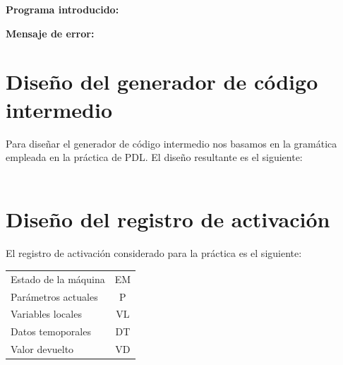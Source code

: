 \documentclass[11pt, , a4paper, titlepage]{article}
\newenvironment{changemargin}[2]{%
\begin{list}{}{%
\setlength{\topsep}{0pt}%
\setlength{\leftmargin}{#1}%
\setlength{\rightmargin}{#2}%
\setlength{\listparindent}{\parindent}%
\setlength{\itemindent}{\parindent}%
\setlength{\parsep}{\parskip}%
}%
\item[]}{\end{list}}
\begin{document}
\begin{changemargin}{+0.5cm}{+0cm}
    \vspace{1mm}

    \textbf{Programa introducido:}
    \begin{changemargin}{+0.5cm}{+0cm}
        
    \end{changemargin}

    \vspace{2mm}

    \textbf{Mensaje de error:}
    \vspace{1mm}
    \begin{changemargin}{+0.5cm}{+0cm}
    \end{changemargin}

\end{changemargin}


\clearpage

\section{Diseño del generador de código intermedio}


Para diseñar el generador de código intermedio nos basamos en la gramática empleada en la práctica de PDL.
El diseño resultante es el siguiente: \\ \\


\clearpage

\section{Diseño del registro de activación}
El registro de activación considerado para la práctica es el siguiente: \\
\begin{table}[H]
    \centering
    \begin{tabular}{ l c }
    Estado de la máquina & EM \\
    Parámetros actuales  & P  \\
    Variables locales    & VL \\
    Datos temoporales    & DT \\
    Valor devuelto       & VD
    \end{tabular}
\end{table}
\end{document}
